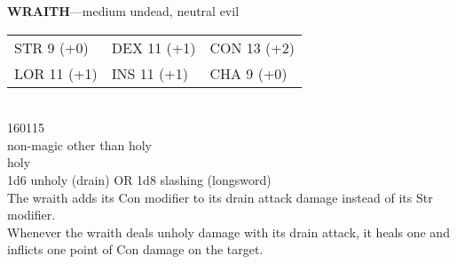 \textbf{WRAITH}---medium undead, neutral evil\\\begin{footnotesize}\begin{tabular}{@{}lll}STR 9 (+0)&DEX 11 (+1)&CON 13 (+2)\\LOR 11 (+1)&INS 11 (+1)&CHA 9 (+0)\end{tabular}\end{footnotesize}\\16\protlinesep{}0\protlinesep{}11\protlinesep{}5\\non-magic other than holy\\holy\\1d6 unholy (drain) OR 1d8 slashing (longsword)\\The wraith adds its Con modifier to its drain attack damage instead of its Str modifier.\\Whenever the wraith deals unholy damage with its drain attack, it heals one and inflicts one point of Con damage on the target.\\